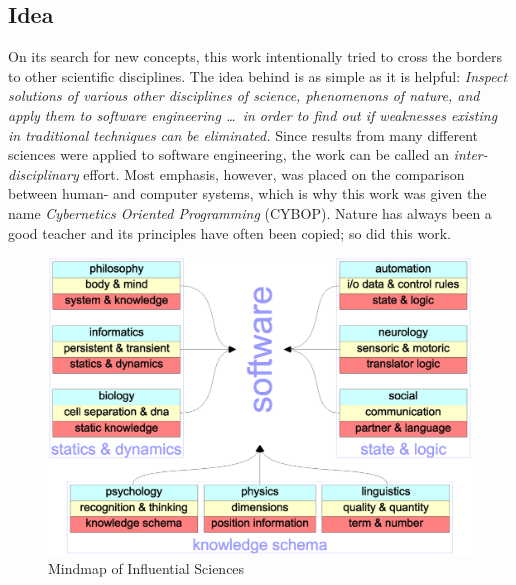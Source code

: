 %
%
%
%
%
%
%

\subsection{Idea}
\label{idea_heading}

On its search for new concepts, this work intentionally tried to cross the
borders to other scientific disciplines. The idea behind is as simple as it is
helpful: \textit{Inspect solutions of various other disciplines of science,
phenomenons of nature, and apply them to software engineering \ldots\ in order
to find out if weaknesses existing in traditional techniques can be eliminated.}
Since results from many different sciences were applied to software engineering,
the work can be called an \emph{inter-disciplinary} effort. Most emphasis,
however, was placed on the comparison between human- and computer systems, which
is why this work was given the name \emph{Cybernetics Oriented Programming}
(CYBOP). Nature has always been a good teacher and its principles have often
been copied; so did this work.

\begin{figure}[ht]
    \begin{center}
        \includegraphics[scale=0.2]{vector/mindmap.eps}
        \caption{Mindmap of Influential Sciences}
        \label{mindmap_figure}
    \end{center}
\end{figure}

